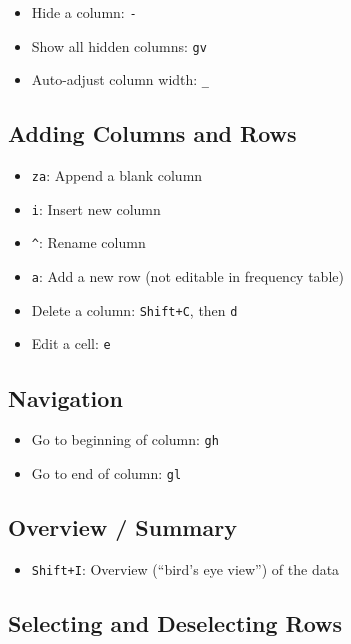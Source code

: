 \documentclass[
  letterpaper,
  DIV=11,
  numbers=noendperiod]{scrartcl}
\providecommand{\tightlist}{%
  \setlength{\itemsep}{0pt}\setlength{\parskip}{0pt}}\usepackage{longtable,booktabs,array}
\begin{document}
\begin{itemize}
\tightlist
\item
  Hide a column: \texttt{-}
\item
  Show all hidden columns: \texttt{gv}
\item
  Auto-adjust column width: \texttt{\_}
\end{itemize}

\subsection{Adding Columns and Rows}\label{adding-columns-and-rows}

\begin{itemize}
\tightlist
\item
  \texttt{za}: Append a blank column
\item
  \texttt{i}: Insert new column
\item
  \texttt{\^{}}: Rename column
\item
  \texttt{a}: Add a new row (not editable in frequency table)
\item
  Delete a column: \texttt{Shift+C}, then \texttt{d}
\item
  Edit a cell: \texttt{e}
\end{itemize}

\subsection{Navigation}\label{navigation}

\begin{itemize}
\tightlist
\item
  Go to beginning of column: \texttt{gh}
\item
  Go to end of column: \texttt{gl}
\end{itemize}

\subsection{Overview / Summary}\label{overview-summary}

\begin{itemize}
\tightlist
\item
  \texttt{Shift+I}: Overview (``bird's eye view'') of the data
\end{itemize}

\subsection{Selecting and Deselecting
Rows}\label{selecting-and-deselecting-rows}
\end{document}
